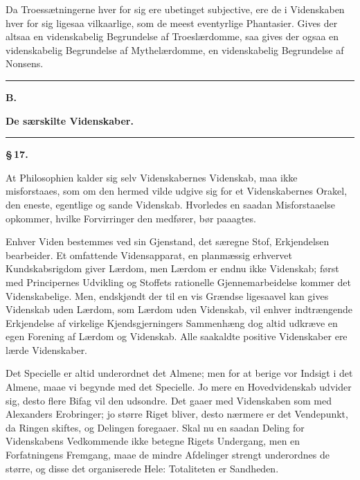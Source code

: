 \documentclass[12pt]{book}
\newcommand{\opage}[1]{\marginnote{\footnotesize\textit{[#1]}}}
\begin{document}
Da Troessætningerne hver for sig ere ubetinget subjective, ere de i Videnskaben hver
for sig ligesaa vilkaarlige, som de meest eventyrlige Phantasier. Gives der altsaa en
videnskabelig Begrundelse af Troeslærdomme, saa gives der ogsaa en videnskabelig
Begrundelse af Mythelærdomme, en videnskabelig Begrundelse af Nonsens.

\begin{center}\rule{0.35\linewidth}{0.4pt}\end{center}

\opage{81} \begin{center}
  {\large\bfseries B.}\par\vspace{2pt}
  {\bfseries De særskilte Videnskaber.}\par\vspace{4pt}
  \rule{2cm}{0.4pt}
\end{center}
{}

\begin{center}{\bfseries \S\,17.}\end{center}

At Philosophien kalder sig selv Videnskabernes Videnskab, maa ikke misforstaaes, som om
den hermed vilde udgive sig for et Videnskabernes Orakel, den eneste, egentlige og
sande Videnskab. Hvorledes en saadan Misforstaaelse opkommer, hvilke Forvirringer den
medfører, bør paaagtes.

Enhver Viden bestemmes ved sin Gjenstand, det særegne Stof, Erkjendelsen bearbeider. Et
omfattende Vidensapparat, en planmæssig erhvervet Kundskabsrigdom giver Lærdom, men
Lærdom er endnu ikke Videnskab; først med Principernes Udvikling og Stoffets rationelle
Gjennemarbeidelse kommer det Videnskabelige. Men, endskjøndt der til en vis Grændse
ligesaavel kan gives Videnskab uden Lærdom, som Lærdom uden Videnskab, vil enhver
indtrængende Erkjendelse af virkelige Kjendsgjerningers Sammenhæng dog altid udkræve en
egen Forening af Lærdom og Videnskab. Alle saakaldte positive Videnskaber ere lærde
Videnskaber.

Det Specielle er altid underordnet det Almene; men for at berige vor Indsigt i det
Almene, maae vi begynde med det Specielle. Jo mere en Hovedvidenskab udvider sig, desto
flere Bifag vil den udsondre. Det gaaer med Videnskaben som med Alexanders Erobringer;
jo større Riget bliver, desto nærmere er det Vendepunkt, da Ringen skiftes, og Delingen
foregaaer. Skal nu en saadan Deling for Videnskabens Vedkommende ikke betegne Rigets
Undergang, men en Forfatningens Fremgang, maae de mindre Afdelinger strengt underordnes
de større, og disse det organiserede Hele: Totaliteten er Sandheden.
\end{document}
